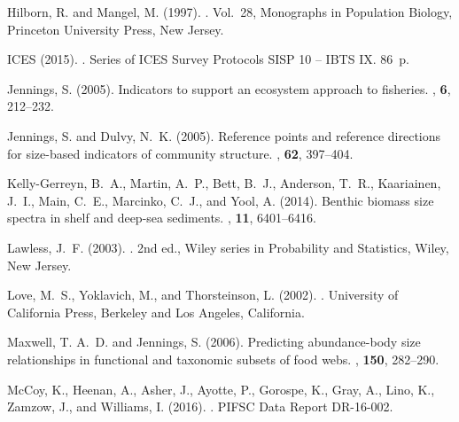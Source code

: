 \begin{thebibliography}{}
Hilborn, R. and Mangel, M. (1997).
.
\newblock Vol.~28, Monographs in Population Biology, Princeton University
  Press, New Jersey.

ICES (2015).
.
\newblock Series of ICES Survey Protocols SISP 10 -- IBTS IX. 86~p.

Jennings, S. (2005).
\newblock Indicators to support an ecosystem approach to fisheries.
, {\bf 6}, 212--232.

Jennings, S. and Dulvy, N.~K. (2005).
\newblock Reference points and reference directions for size-based indicators
  of community structure.
, {\bf 62}, 397--404.

Kelly-Gerreyn, B.~A., Martin, A.~P., Bett, B.~J., Anderson, T.~R., Kaariainen,
  J.~I., Main, C.~E., Marcinko, C.~J., and Yool, A. (2014).
\newblock Benthic biomass size spectra in shelf and deep-sea sediments.
, {\bf 11}, 6401--6416.

Lawless, J.~F. (2003).
.
\newblock 2nd ed., Wiley series in Probability and Statistics, Wiley, New
  Jersey.

Love, M.~S., Yoklavich, M., and Thorsteinson, L. (2002).
.
\newblock University of California Press, Berkeley and Los Angeles, California.

Maxwell, T. A.~D. and Jennings, S. (2006).
\newblock Predicting abundance-body size relationships in functional and
  taxonomic subsets of food webs.
, {\bf 150}, 282--290.

McCoy, K., Heenan, A., Asher, J., Ayotte, P., Gorospe, K., Gray, A., Lino, K.,
  Zamzow, J., and Williams, I. (2016).
.
\newblock PIFSC Data Report DR-16-002.


\end{thebibliography}
